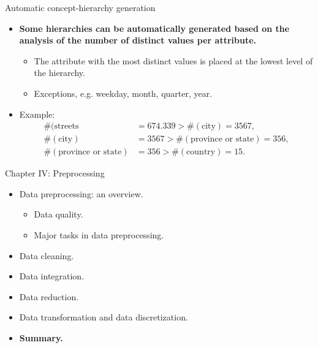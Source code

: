 \documentclass[aspectratio=169,t]{beamer}
\begin{document}
  { 
    \begin{frame}{Automatic concept-hierarchy generation}
        \begin{itemize}
            \item \textbf{Some hierarchies can be automatically generated based on the analysis of the number of distinct values per attribute.}
            \begin{itemize}
              \item The attribute with the most distinct values is placed at the lowest level of the hierarchy.
              \item Exceptions, e.g. weekday, month, quarter, year.
            \end{itemize}
            \item Example: 
            \begin{align}
            \#(\text{streets} &= 674.339 > \#(\text{city}) =  3567,\\
            \#(\text{city}) &=  3567 > \#(\text{province or state}) =  356,\\
            \#(\text{province or state}) &=  356 > \#(\text{country}) = 15.
            \end{align}
        \end{itemize}
    \end{frame}
  }

  { 
    \begin{frame}{Chapter IV: Preprocessing}
        \begin{itemize}
            \item Data preprocessing: an overview.
            \begin{itemize}
              \item Data quality.
              \item Major tasks in data preprocessing.
            \end{itemize}
            \item Data cleaning.
            \item Data integration.
            \item Data reduction.
            \item Data transformation and data discretization.
            \item \textbf{Summary.}
        \end{itemize}
    \end{frame}
  }
\end{document}
